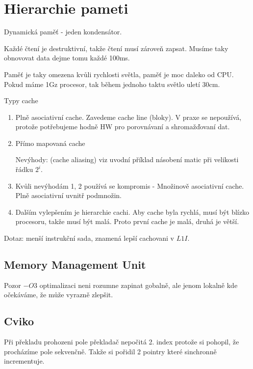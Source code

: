 \section{\texorpdfstring{Hierarchie pameti}{Hierarchie pameti}}
\vspace{5mm}
\large

\begin{definition}
	Dynamická paměť - jeden kondensátor.

	Každé čtení je destruktivní, takže čtení musí zároveň zapsat.
	Musíme taky obnovovat data dejme tomu každé 100ms.
\end{definition}

Paměť je taky omezena kvůli rychlosti světla, paměť je moc daleko od CPU.
Pokud máme 1Gz procesor, tak během jednoho taktu světlo uletí 30cm.

Typy cache
\begin{enumerate}
	\item Plně asociativní cache. Zavedeme cache line (bloky).
		V praxe se nepoužívá, protože potřebujeme hodně HW pro porovnávaní a shromažďovaní dat.
	\item Přímo mapovaná cache

		Nevýhody: (cache aliasing) viz uvodní příklad násobení matic při velikosti řádku $2^i$.
	\item Kvůli nevýhodám 1, 2 používá se kompromis - Množinově asociativní cache.
		Plně asociativní uvnitř podmnožin.
	\item Dalším vylepšením je hierarchie cachi. Aby cache byla rychlá, musí být blízko procesoru, takže musí být malá. Proto první cache je malá, druhá je větší.
\end{enumerate}

Dotaz: menší instrukční sada, znamená lepší cachovani v $L1I$.

\subsection{Memory Management Unit}

\begin{note}
Pozor $-O3$ optimalizaci neni rozumne zapinat gobalně, ale jenom lokalně kde očekáváme, že může vyrazně zlepšit.
\end{note}

\subsection{Cviko}

\begin{example}
	Při překladu prohozeni pole překladač nepočitá 2. index protože si pohopil, že procházíme pole sekvenčně.
	Takže si pořidil 2 pointry které sinchronně incrementuje.
\end{example}


